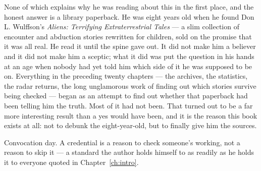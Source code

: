 \vspace{4pt}\par
{}%
\noindent None of which explains why he was reading about this in the first place, and the honest
answer is a library paperback. He was eight years old when he found Don L. Wulffson's
\emph{Aliens: Terrifying Extraterrestrial Tales} --- a slim collection of encounter and abduction
stories rewritten for children, sold on the promise that it was all real. He read it until the
spine gave out. It did not make him a believer and it did not make him a sceptic; what it did was
put the question in his hands at an age when nobody had yet told him which side of it he was
supposed to be on. Everything in the preceding twenty chapters --- the archives, the statistics, the
radar returns, the long unglamorous work of finding out which stories survive being checked ---
began as an attempt to find out whether that paperback had been telling him the truth. Most of it
had not been. That turned out to be a far more interesting result than a yes would have
been, and it is the reason this book exists at all: not to debunk the eight-year-old, but to
finally give him the sources.

\vspace{4pt}\par
\Needspace*{3.9in}
\begin{center}
\end{center}
\vspace{3pt}\par
\noindent\begin{minipage}{\linewidth}
{\RaggedRight\scriptsize\color{steel} Convocation day. A credential is a reason to check someone's
working, not a reason to skip it --- a standard the author holds himself to as readily as he holds
it to everyone quoted in Chapter~\ref{ch:intro}.\par}
\end{minipage}\par\vspace{13pt}

